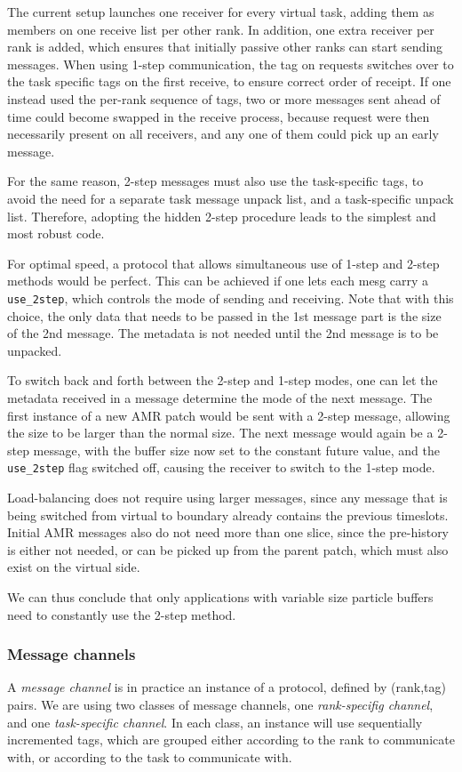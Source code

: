 \documentclass[paper=a4,fontsize=11pt]{scrartcl}
\numberwithin{equation}{section}		%
\numberwithin{figure}{section}			%
\numberwithin{table}{section}				%
\newcommand{\codecolor}{\color{Blue}}
\newcommand{\Code}[1]{{\codecolor\texttt{#1}}}
\begin{document}
The current setup launches one receiver for every virtual task, adding them as members on one receive list per other rank.  In addition, one extra receiver per rank is added, which ensures that initially passive other ranks can start sending messages.  When using 1-step communication, the tag on requests switches over to the task specific tags on the first receive, to ensure correct order of receipt.  If one instead used the per-rank sequence of tags, two or more messages sent ahead of time could become swapped in the receive process, because request were then necessarily present on all receivers, and any one of them could pick up an early message.

For the same reason, 2-step messages must also use the task-specific tags, to avoid the need for a separate task message unpack list, and a task-specific unpack list.  Therefore, adopting the hidden 2-step procedure leads to the simplest and most robust code.

For optimal speed, a protocol that allows simultaneous use of 1-step and 2-step methods would be perfect.  This can be achieved if one lets each mesg carry a \Code{use\_2step}, which controls the mode of sending and receiving.  Note that with this choice, the only data that needs to be passed in the 1st message part is the size of the 2nd message.  The metadata is not needed until the 2nd message is to be unpacked.

To switch back and forth between the 2-step and 1-step modes, one can let the metadata received in a message determine the mode of the next message.  The first instance of a new AMR patch would be sent with a 2-step message, allowing the size to be larger than the normal size.  The next message would again be a 2-step message, with the buffer size now set to the constant future value, and the \Code{use\_2step} flag switched off, causing the receiver to switch to the 1-step mode.

Load-balancing does not require using larger messages, since any message that is being switched from virtual to boundary already contains the previous timeslots.  Initial AMR messages also do not need more than one slice, since the pre-history is either not needed, or can be picked up from the parent patch, which must also exist on the virtual side.

We can thus conclude that only applications with variable size particle buffers need to constantly use the 2-step method.

\subsubsection{Message channels}
A \textit{message channel} is in practice an instance of a protocol, defined by (rank,tag) pairs.  We are using two classes of message channels, one \textit{rank-specifig channel}, and one \textit{task-specific channel}. In each class, an instance will use sequentially incremented tags, which are grouped either according to the rank to communicate with, or according to the task to communicate with.
\end{document}
